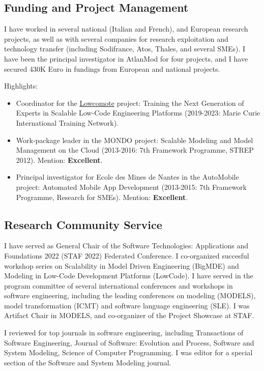 \subsection{Funding and Project Management}
I have worked in several national (Italian and French), and European research projects, as well as with several companies for research exploitation and technology transfer (including Sodifrance, Atos, Thales, and several SMEs). I have been the principal investigator in AtlanMod for four projects, and I have secured 430K Euro in fundings from European and national projects.

\medskip
Highlights:
 \begin{itemize}
 \item Coordinator for the \href{https://www.lowcomote.eu/}{Lowcomote} project: Training the Next Generation of Experts in Scalable Low-Code Engineering Platforms (2019-2023: Marie Curie International Training Network).
 \item Work-package leader in the MONDO project: Scalable Modeling and Model Management on the Cloud (2013-2016: 7th Framework Programme, STREP 2012). Mention: \textbf{Excellent}.
 \item Principal investigator for Ecole des Mines de Nantes in the AutoMobile project: Automated Mobile App Development (2013-2015: 7th Framework Programme, Research for SMEs). Mention: \textbf{Excellent}.
\end{itemize}

\subsection{Research Community Service}

I have served as General Chair of the Software Technologies: Applications and Foundations 2022 (STAF 2022) Federated Conference. I co-organized succesful workshop series on Scalability in Model Driven Engineering (BigMDE) and Modeling in Low-Code Development Platforms (LowCode). 
I have served in the program committee of several international conferences and workshops in software engineering, including the leading conferences on modeling (MODELS), model transformation (ICMT) and software language engineering (SLE). I was Artifact Chair in MODELS, and co-organizer of the Project Showcase at STAF.

I reviewed for top journals in software engineering, including Transactions of Software Engineering, Journal of Software: Evolution and Process, Software and System Modeling, Science of Computer Programming. I was editor for a special section of the Software and System Modeling journal.

